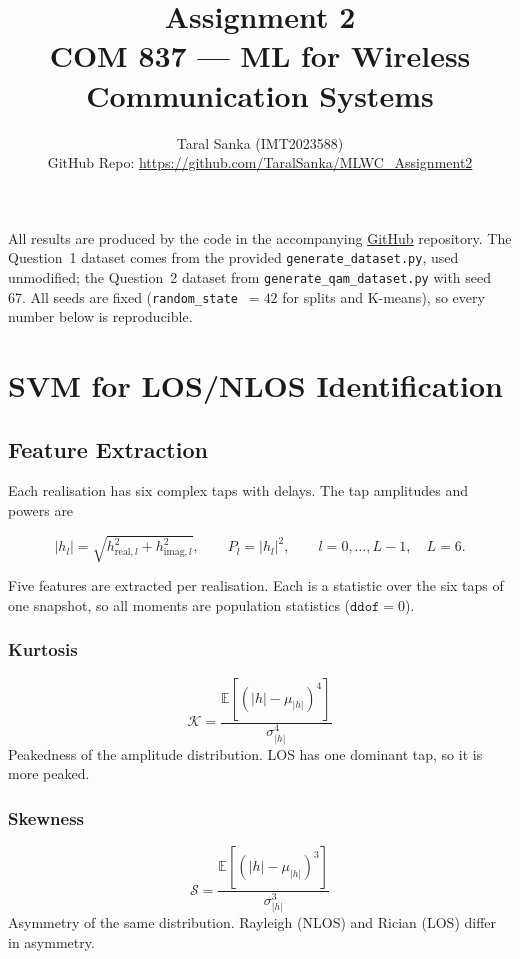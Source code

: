 \documentclass[11pt,a4paper]{article}
\title{\vspace{-1.5cm}\textbf{Assignment 2}\\[0.3em]
       \large COM 837 --- ML for Wireless Communication Systems}
\author{Taral Sanka (IMT2023588)\\[0.5em]
        \normalsize GitHub Repo: \href{https://github.com/TaralSanka/MLWC_Assignment2/tree/main}%
        {https://github.com/TaralSanka/MLWC\_Assignment2}}
\date{}
\begin{document}
\maketitle
\thispagestyle{fancy}

\noindent
All results are produced by the code in the accompanying
\href{https://github.com/TaralSanka/MLWC_Assignment2/tree/main}{GitHub} repository. The Question~1
dataset comes from the provided \texttt{generate\_dataset.py}, used unmodified; the
Question~2 dataset from \texttt{generate\_qam\_dataset.py} with seed 67. All seeds are fixed
(\texttt{random\_state}~$=42$ for splits and K-means), so every number below is reproducible.

\section{SVM for LOS/NLOS Identification}

\subsection{Feature Extraction}

Each realisation has six complex taps with delays. The tap amplitudes and powers are

\begin{equation}
|h_l| = \sqrt{h_{\mathrm{real},l}^2 + h_{\mathrm{imag},l}^2},
\qquad P_l = |h_l|^2, \qquad l = 0,\dots,L-1,\quad L = 6 .
\end{equation}

Five features are extracted per realisation. Each is a statistic over the six taps of one
snapshot, so all moments are population statistics ($\texttt{ddof}=0$).

\subsubsection{Kurtosis}
\vspace{-0.6em}
\begin{equation}
\mathcal{K} = \frac{\mathbb{E}\!\left[\left(|h| - \mu_{|h|}\right)^4\right]}{\sigma_{|h|}^4}
\end{equation}
Peakedness of the amplitude distribution. LOS has one dominant tap, so it is more peaked.

\subsubsection{Skewness}
\vspace{-0.6em}
\begin{equation}
\mathcal{S} = \frac{\mathbb{E}\!\left[\left(|h| - \mu_{|h|}\right)^3\right]}{\sigma_{|h|}^3}
\end{equation}
Asymmetry of the same distribution. Rayleigh (NLOS) and Rician (LOS) differ in asymmetry.
\end{document}
